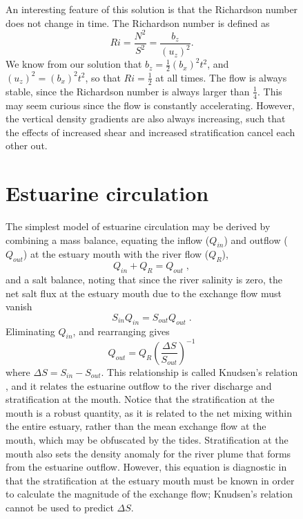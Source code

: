 \documentclass[11pt]{report}
\numberwithin{equation}{section}
\begin{document}
\begin{figure}
An interesting feature of this solution is that the Richardson number does not change in time.  The Richardson number is defined as
\begin{equation}
    Ri = \frac{N^2}{S^2} = \frac{b_z}{(u_z)^2}.
\end{equation}
We know from our solution that $b_z = \frac{1}{2}(b_x)^2 t^2$, and $(u_z)^2 = (b_x)^2 t^2$, so that $Ri=\frac{1}{2}$ at all times.  The flow is always stable, since the Richardson number is always larger than $\frac{1}{4}$.  This may seem curious since the flow is constantly accelerating.  However, the vertical density gradients are also always increasing, such that the effects of increased shear and increased stratification cancel each other out.



\section{Estuarine circulation}

The simplest model of estuarine circulation may be derived by combining a mass balance, equating the inflow ($Q_{in}$) and outflow ($Q_{out}$) at the estuary mouth with the river flow ($Q_R$),
\begin{equation}
    Q_{in} + Q_R = Q_{out} \; ,
\end{equation}
and a salt balance, noting that since the river salinity is zero, the net salt flux at the estuary mouth due to the exchange flow must vanish
\begin{equation}
    S_{in} Q_{in} = S_{out} Q_{out} \; .
\end{equation}
Eliminating $Q_{in}$, and rearranging gives
\begin{equation}
    Q_{out} = Q_R \left( \frac{\Delta S}{S_{out}} \right)^{-1}
\end{equation}
where $\Delta S = S_{in} - S_{out}$.  This relationship is called Knudsen's relation \citep{knudsen:00}, and it relates the estuarine outflow to the river discharge and stratification at the mouth.  Notice that the stratification at the mouth is a robust quantity, as it is related to the net mixing within the entire estuary, rather than the mean exchange flow at the mouth, which may be obfuscated by the tides.  Stratification at the mouth also sets the density anomaly for the river plume that forms from the estuarine outflow.  However, this equation is diagnostic in that the stratification at the estuary mouth must be known in order to calculate the magnitude of the exchange flow; Knudsen's relation cannot be used to predict $\Delta S$.


\end{figure}
\end{document}

